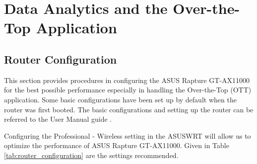 \section{Data Analytics and the Over-the-Top Application}

\subsection{Router Configuration}
This section provides procedures in configuring the ASUS Rapture GT-AX11000 for the best possible performance especially in handling the Over-the-Top (OTT) application. Some basic configurations have been set up by default when the router was first booted. The basic configurations and setting up the router can be referred to the User Manual guide \cite{rog_2019}.

Configuring the Professional - Wireless setting in the ASUSWRT will allow us to optimize the performance of ASUS Rapture GT-AX11000. Given in Table \ref{tab:router_configuration} are the settings recommended.

